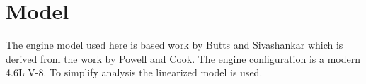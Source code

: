 \documentclass[twocolumn]{article}
\begin{document}


\thispagestyle{empty}
\begin{abstract}
\noindent



\end{abstract}

\section{Model}

The engine model used here is based work
by Butts and Sivashankar\autocite{532315} which is derived from
the work by Powell and Cook\autocite{4789342}.
The engine configuration is a modern 4.6L V-8.
To simplify analysis the linearized model is used.


\pagebreak
\printbibliography[heading=bibintoc]
\end{document}
